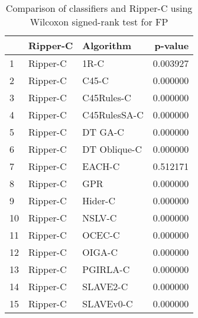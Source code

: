 \begin{table}
\footnotesize
\caption{Comparison of classifiers and Ripper-C using Wilcoxon signed-rank test for FP}
\label{tab:Ripper-C wilcoxon FP comparison}
\begin{tabular}{lllr}
\hline
 & Ripper-C & Algorithm & p-value \\
\hline
1 & Ripper-C & 1R-C & 0.003927 \\
2 & Ripper-C & C45-C & 0.000000 \\
3 & Ripper-C & C45Rules-C & 0.000000 \\
4 & Ripper-C & C45RulesSA-C & 0.000000 \\
5 & Ripper-C & DT GA-C & 0.000000 \\
6 & Ripper-C & DT Oblique-C & 0.000000 \\
7 & Ripper-C & EACH-C & 0.512171 \\
8 & Ripper-C & GPR & 0.000000 \\
9 & Ripper-C & Hider-C & 0.000000 \\
10 & Ripper-C & NSLV-C & 0.000000 \\
11 & Ripper-C & OCEC-C & 0.000000 \\
12 & Ripper-C & OIGA-C & 0.000000 \\
13 & Ripper-C & PGIRLA-C & 0.000000 \\
14 & Ripper-C & SLAVE2-C & 0.000000 \\
15 & Ripper-C & SLAVEv0-C & 0.000000 \\
\hline
\end{tabular}
\end{table}
